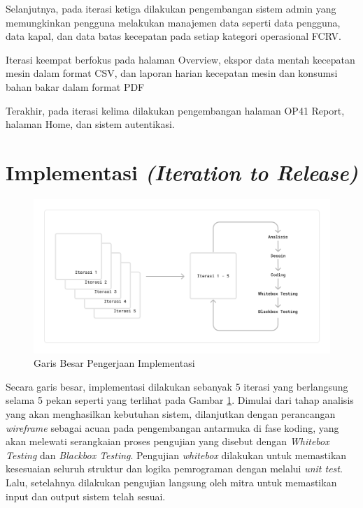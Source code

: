 

Selanjutnya, pada iterasi ketiga dilakukan pengembangan sistem admin yang memungkinkan pengguna melakukan manajemen data seperti data pengguna, data kapal, dan data batas kecepatan pada setiap kategori operasional FCRV.



Iterasi keempat berfokus pada halaman Overview, ekspor data mentah kecepatan mesin dalam format CSV, dan laporan harian kecepatan mesin dan konsumsi bahan bakar dalam format PDF



Terakhir, pada iterasi kelima dilakukan pengembangan halaman OP41 Report, halaman Home, dan sistem autentikasi.




\section{Implementasi \textit{(Iteration to Release)}}

\begin{figure}[!h]
    \includegraphics[width=1.05\linewidth, center]{images/hasil/overview.png}
    \caption{Garis Besar Pengerjaan Implementasi}
    \label{fig:imp-overview}
\end{figure}

Secara garis besar, implementasi dilakukan sebanyak 5 iterasi yang berlangsung selama 5 pekan seperti yang terlihat pada Gambar \ref{fig:imp-overview}. Dimulai dari tahap analisis yang akan menghasilkan kebutuhan sistem, dilanjutkan dengan perancangan \textit{wireframe} sebagai acuan pada pengembangan antarmuka di fase koding, yang akan melewati serangkaian proses pengujian yang disebut dengan \textit{Whitebox Testing} dan \textit{Blackbox Testing}. Pengujian \textit{whitebox} dilakukan untuk memastikan kesesuaian seluruh struktur dan logika pemrograman dengan melalui \textit{unit test}. Lalu, setelahnya dilakukan pengujian langsung oleh mitra untuk memastikan input dan output sistem telah sesuai.

